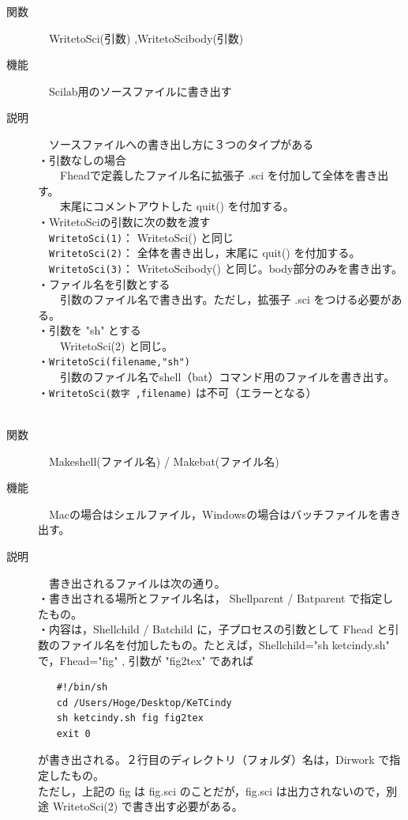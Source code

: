 \documentclass[papersize,a4paper,12pt,uplatex]{jsarticle}
\begin{document}
\begin{description}
\hypertarget{writetosci}{}
\item[関数]　WritetoSci(引数) ,WritetoScibody(引数)
\item[機能]　Scilab用のソースファイルに書き出す
\item[説明]　ソースファイルへの書き出し方に３つのタイプがある\\

・引数なしの場合\\
　　Fheadで定義したファイル名に拡張子 .sci を付加して全体を書き出す。\\
　　末尾にコメントアウトした quit() を付加する。\\
・WritetoSciの引数に次の数を渡す \\
　\verb|WritetoSci(1)|： WritetoSci() と同じ\\
　\verb|WritetoSci(2)|： 全体を書き出し，末尾に quit() を付加する。\\
　\verb|WritetoSci(3)|： WritetoScibody() と同じ。body部分のみを書き出す。\\
・ファイル名を引数とする\\
　　引数のファイル名で書き出す。ただし，拡張子 .sci をつける必要がある。\\
・引数を "sh" とする\\
　　WritetoSci(2) と同じ。\\ 
・\verb|WritetoSci(filename,"sh")|\\
　　引数のファイル名でshell（bat）コマンド用のファイルを書き出す。\\
・\verb|WritetoSci(数字 ,filename)| は不可（エラーとなる）\\
\\

\hypertarget{makeshell}{}
\item[関数]　Makeshell(ファイル名) / Makebat(ファイル名)
\item[機能]　Macの場合はシェルファイル，Windowsの場合はバッチファイルを書き出す。
\item[説明]　書き出されるファイルは次の通り。\\
・書き出される場所とファイル名は，  Shellparent / Batparent で指定したもの。\\
・内容は，Shellchild / Batchild に，子プロセスの引数として Fhead と引数のファイル名を付加したもの。たとえば，Shellchild="sh ketcindy.sh" で，Fhead="fig" , 引数が "fig2tex" であれば
\begin{verbatim}
　　#!/bin/sh
　　cd /Users/Hoge/Desktop/KeTCindy
　　sh ketcindy.sh fig fig2tex
　　exit 0
\end{verbatim}
が書き出される。２行目のディレクトリ（フォルダ）名は，Dirwork で指定したもの。\\
ただし，上記の fig は fig.sci のことだが，fig.sci は出力されないので，別途 WritetoSci(2) で書き出す必要がある。\\
　\\


\end{description}
\end{document}
